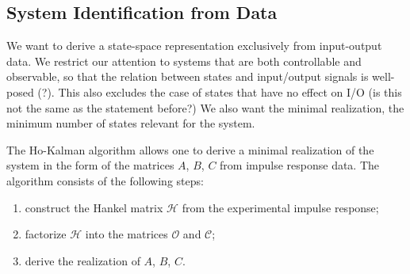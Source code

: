 

\subsection{System Identification from Data}
\label{sec:ho-kalman-algorithm}

We want to derive a state-space representation exclusively from input-output data. We restrict our attention to systems that are both controllable and observable, so that the relation between states and input/output signals is well-posed (?). This also excludes the case of states that have no effect on I/O (is this not the same as the statement before?) We also want the minimal realization, the minimum number of states relevant for the system.

The Ho-Kalman algorithm allows one to derive a minimal realization of the system in the form of the matrices $A$, $B$, $C$ from impulse response data. The algorithm consists of the following steps:
\begin{enumerate}
\item construct the Hankel matrix $\mathcal{H}$ from the experimental impulse response;
\item factorize $\mathcal{H}$ into the matrices $\mathcal{O}$ and $\mathcal{C}$;
\item derive the realization of $A$, $B$, $C$.
\end{enumerate}

